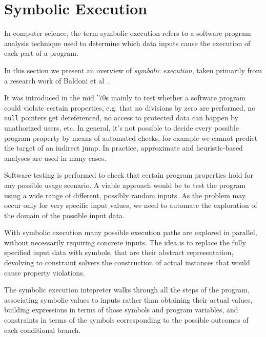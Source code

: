 \section{Symbolic Execution}
In computer science, the term symbolic execution refers to a software program analysis technique used to determine which data inputs cause the execution of each part of a program.

In this section we present an overview of \textit{symbolic execution}, taken primarily from a research work of Baldoni et al~\cite{Baldoni:2018:SSE:3212709.3182657}.

 It was introduced in the mid '70s %
 mainly to test whether a software program could violate certain properties, e.g. that no divisions by zero are performed, no \texttt{null} pointers get dereferenced, no access to protected data can happen by unathorized users, etc. In general, it's not possible to decide every possible program property by means of automated checks, for example we cannot predict the target of an indirect jump. %
In practice, approximate and heuristic-based analyses are used in many cases.%

Software testing is performed to check that certain program properties hold for any possible usage scenario. A viable approach would be to test the program using a wide range of different, possibly random inputs. As the problem may occur only for very specific input values, we need to automate the exploration of the domain of the possible input data. 

With symbolic execution many possible execution paths are explored in parallel, without necessarily requiring concrete inputs. The idea is to replace the fully specified input data with symbols, that are their abstract representation, devolving to constraint solvers the construction of actual instances that would cause property violations. 

The symbolic execution intepreter walks through all the steps of the program, associating symbolic values to inputs rather than obtaining their actual values, building  expressions in terms of those symbols and program variables, and constraints in terms of the symbols corresponding to the possible outcomes of each conditional branch. 


